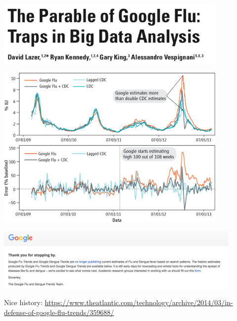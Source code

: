 \documentclass[aspectratio=169]{beamer}
\begin{document}
\begin{frame}

\begin{center}
  \includegraphics[width = 0.85\textwidth]{figures/lazer_parable_2014_title}
\end{center}

\end{frame}
\begin{frame}

\begin{center}
  \includegraphics[width = 0.85\textwidth]{figures/lazer_parable_2014_fig2}
\end{center}

\end{frame}
\begin{frame}

\begin{center}
  \includegraphics[width = 0.9\textwidth]{figures/google_flu_closed}
\end{center}

\vfill
Nice history: \url{https://www.theatlantic.com/technology/archive/2014/03/in-defense-of-google-flu-trends/359688/}

\end{frame}
\end{document}
